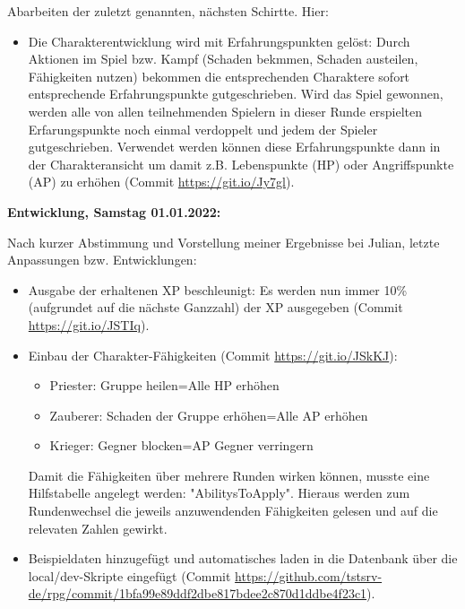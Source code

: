 {            Abarbeiten der zuletzt genannten, nächsten Schirtte. Hier: 

            \begin{itemize}
                \item Die Charakterentwicklung wird mit Erfahrungspunkten gelöst: Durch Aktionen im Spiel bzw. Kampf (Schaden bekmmen, Schaden austeilen, Fähigkeiten nutzen) bekommen die entsprechenden Charaktere sofort entsprechende Erfahrungspunkte gutgeschrieben. Wird das Spiel gewonnen, werden alle von allen teilnehmenden Spielern in dieser Runde erspielten Erfarungspunkte noch einmal verdoppelt und jedem der Spieler gutgeschrieben. Verwendet werden können diese Erfahrungspunkte dann in der Charakteransicht um damit z.B. Lebenspunkte (HP) oder Angriffspunkte (AP) zu erhöhen (Commit \url{https://git.io/Jy7gl}).
            \end{itemize}


            \textbf{Entwicklung, Samstag 01.01.2022:}

            Nach kurzer Abstimmung und Vorstellung meiner Ergebnisse bei Julian, letzte Anpassungen bzw. Entwicklungen: 

            \begin{itemize}
                \item Ausgabe der erhaltenen XP beschleunigt: Es werden nun immer 10\% (aufgrundet auf die nächste Ganzzahl) der XP ausgegeben (Commit \url{https://git.io/JSTIq}).
                \item Einbau der Charakter-Fähigkeiten (Commit \url{https://git.io/JSkKJ}):
                \begin{itemize}
                    \item Priester: Gruppe heilen=Alle HP erhöhen
                    \item Zauberer: Schaden der Gruppe erhöhen=Alle AP erhöhen
                    \item Krieger: Gegner blocken=AP Gegner verringern
                \end{itemize} 
                Damit die Fähigkeiten über mehrere Runden wirken können, musste eine Hilfstabelle angelegt werden: "AbilitysToApply". Hieraus werden zum Rundenwechsel die jeweils anzuwendenden Fähigkeiten gelesen und auf die relevaten Zahlen gewirkt. 
                \item Beispieldaten hinzugefügt und automatisches laden in die Datenbank über die local/dev-Skripte eingefügt (Commit \url{https://github.com/tstsrv-de/rpg/commit/1bfa99e89ddf2dbe817bdee2c870d1ddbe4f23c1}).
            \end{itemize} 


}
